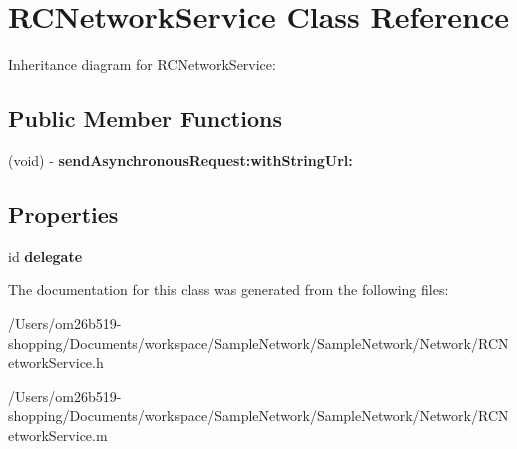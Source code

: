 \hypertarget{interface_r_c_network_service}{\section{R\-C\-Network\-Service Class Reference}
\label{interface_r_c_network_service}
}


Inheritance diagram for R\-C\-Network\-Service\-:
\subsection*{Public Member Functions}
\begin{DoxyCompactItemize}
\item 
\hypertarget{interface_r_c_network_service_af13560f61d8093f4553e24472d6d84cf}{(void) -\/ {\bfseries send\-Asynchronous\-Request\-:with\-String\-Url\-:}}\label{interface_r_c_network_service_af13560f61d8093f4553e24472d6d84cf}

\end{DoxyCompactItemize}
\subsection*{Properties}
\begin{DoxyCompactItemize}
\item 
\hypertarget{interface_r_c_network_service_a610111ad5aae0943e7123a15e62bdb97}{id {\bfseries delegate}}\label{interface_r_c_network_service_a610111ad5aae0943e7123a15e62bdb97}

\end{DoxyCompactItemize}


The documentation for this class was generated from the following files\-:\begin{DoxyCompactItemize}
\item 
/\-Users/om26b519-\/shopping/\-Documents/workspace/\-Sample\-Network/\-Sample\-Network/\-Network/R\-C\-Network\-Service.\-h\item 
/\-Users/om26b519-\/shopping/\-Documents/workspace/\-Sample\-Network/\-Sample\-Network/\-Network/R\-C\-Network\-Service.\-m\end{DoxyCompactItemize}
